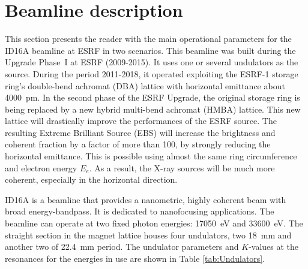 \documentclass{iucr}              %
\begin{document}

\section{Beamline description}
\label{Beamline description}

This section presents the reader with the main operational parameters for the ID16A beamline at ESRF \cite{ID16A} in two scenarios. This beamline was built during the Upgrade Phase~I at ESRF (2009-2015). It uses one or several undulators as the source. During the period 2011-2018, it operated exploiting the ESRF-1 storage ring’s double-bend achromat (DBA) lattice with horizontal emittance about 4000~pm. In the second phase of the ESRF Upgrade, the original storage ring is being replaced by a new hybrid multi-bend achromat (HMBA) lattice. This new lattice will drastically improve the performances of the ESRF source. The resulting Extreme Brilliant Source (EBS) \cite{orangebook} will increase the brightness and coherent fraction by a factor of more than 100, by strongly reducing the horizontal emittance. This is possible using almost the same ring circumference and electron energy $E_e$. As a result, the X-ray sources will be much more coherent, especially in the horizontal direction.

ID16A is a beamline that provides a nanometric, highly coherent beam with broad energy-bandpass. It is dedicated to nanofocusing applications. The beamline can operate at two fixed photon energies: 17050~eV and 33600~eV. The straight section in the magnet lattice houses four undulators, two 18~mm and another two of 22.4~mm period. The undulator parameters and $K$-values at the resonances for the energies in use are shown in Table \ref{tab:Undulators}. 
\end{document}
